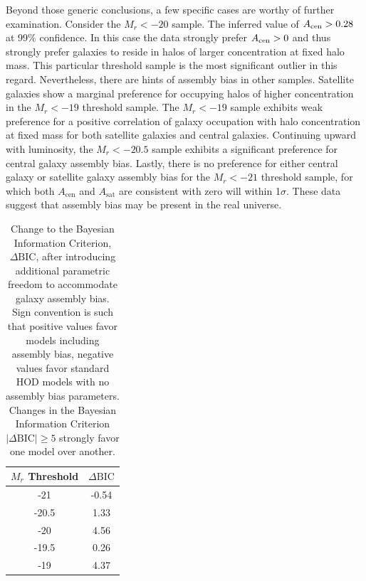 \documentclass[usenatbib,usegraphicx,letterpaper]{mn2e}
\begin{document}
Beyond those generic conclusions, a few specific cases are worthy of further examination. 
Consider the $M_r < -20$ sample. The inferred value of $A_{\rm cen} > 0.28$ at 99\% 
confidence. In this case the data strongly prefer $A_{\rm cen} > 0$ and thus strongly prefer 
galaxies to reside in halos of larger concentration at fixed halo mass. This particular threshold 
sample is the most significant outlier in this regard. Nevertheless, there are hints of assembly 
bias in other samples. Satellite galaxies show a marginal preference for occupying halos of 
higher concentration in the $M_r < -19$ threshold sample. The $M_r < -19$ sample exhibits 
weak preference for a positive correlation of galaxy occupation with halo concentration at fixed 
mass for both satellite galaxies and central galaxies. Continuing upward with luminosity, 
the $M_r < -20.5$ sample exhibits a significant preference for central galaxy assembly bias. 
Lastly, there is no preference for either central galaxy or satellite galaxy assembly bias 
for the $M_r < -21$ threshold sample, for which both $A_{\mathrm{cen}}$ and $A_{\mathrm{sat}}$ 
are consistent with zero will within 1$\sigma$. These data suggest that assembly bias 
may be present in the real universe.


\begin{table}
\begin{center}
{\renewcommand{\arraystretch}{1.3}
\renewcommand{\tabcolsep}{0.2cm}
\begin{tabular}{c c}
\hline 
\hline
$M_r$ Threshold & $\Delta \mathrm{BIC}$ \\ 
\hline
-21 & -0.54 \\
-20.5 & 1.33 \\
-20 & 4.56\\
-19.5 & 0.26\\
-19 & 4.37\\
\hline
\end{tabular}
\medskip
\caption{
Change to the Bayesian Information Criterion, $\Delta \mathrm{BIC}$, 
after introducing additional parametric freedom to accommodate galaxy 
assembly bias. Sign convention is such that positive values favor models including 
assembly bias, negative values favor standard HOD models with no assembly bias parameters. Changes in 
the Bayesian Information Criterion $\vert \Delta \mathrm{BIC}\vert \ge 5$ strongly favor one model 
over another.
}
 }
 \label{table:priors}
 \end{center}
\end{table}
\end{document}
